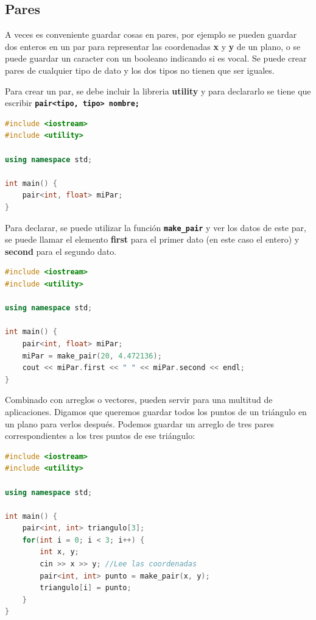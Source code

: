 \documentclass{article}
\begin{document}
\subsection{Pares}

A veces es conveniente guardar cosas en pares, por ejemplo se pueden guardar dos enteros en un par para representar las coordenadas \textbf{x} y \textbf{y} de un plano, o se puede guardar un caracter con un booleano indicando si es vocal. Se puede crear pares de cualquier tipo de dato y los dos tipos no tienen que ser iguales.

Para crear un par, se debe incluir la libreria \textbf{utility} y para declararlo se tiene que escribir \textbf{\lstinline{pair<tipo, tipo> nombre;}}

\begin{lstlisting}[language=C++, caption=Declarando pares]
#include <iostream>
#include <utility>

using namespace std;

int main() {
    pair<int, float> miPar;
}
\end{lstlisting}

Para declarar, se puede utilizar la función \textbf{\lstinline{make_pair}} y ver los datos de este par, se puede llamar el elemento \textbf{first} para el primer dato (en este caso el entero) y \textbf{second} para el segundo dato.

\begin{lstlisting}[language=C++, caption=Declarando pares]
#include <iostream>
#include <utility>

using namespace std;

int main() {
    pair<int, float> miPar;
    miPar = make_pair(20, 4.472136);
    cout << miPar.first << " " << miPar.second << endl;
}
\end{lstlisting}

Combinado con arreglos o vectores, pueden servir para una multitud de aplicaciones. Digamos que queremos guardar todos los puntos de un triángulo en un plano para verlos después. Podemos guardar un arreglo de tres pares correspondientes a los tres puntos de ese triángulo:

\begin{lstlisting}[language=C++, caption=Arreglo de pares]
#include <iostream>
#include <utility>

using namespace std;

int main() {
    pair<int, int> triangulo[3];
    for(int i = 0; i < 3; i++) {
        int x, y;
        cin >> x >> y; //Lee las coordenadas
        pair<int, int> punto = make_pair(x, y);
        triangulo[i] = punto;
    }
}
\end{lstlisting}
\end{document}
